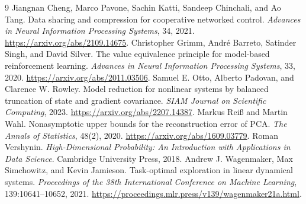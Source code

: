 \documentclass{article}
\begin{document}
\begin{thebibliography}{9}
Jiangnan Cheng, Marco Pavone, Sachin Katti, Sandeep Chinchali, and Ao Tang.
Data sharing and compression for cooperative networked control.
\emph{Advances in Neural Information Processing Systems}, 34, 2021.
\url{https://arxiv.org/abs/2109.14675}.
Christopher Grimm, Andr\'e Barreto, Satinder Singh, and David Silver.
The value equivalence principle for model-based reinforcement learning.
\emph{Advances in Neural Information Processing Systems}, 33, 2020.
\url{https://arxiv.org/abs/2011.03506}.
Samuel E. Otto, Alberto Padovan, and Clarence W. Rowley.
Model reduction for nonlinear systems by balanced truncation of state and gradient covariance.
\emph{SIAM Journal on Scientific Computing}, 2023.
\url{https://arxiv.org/abs/2207.14387}.
Markus Rei\ss{} and Martin Wahl.
Nonasymptotic upper bounds for the reconstruction error of PCA.
\emph{The Annals of Statistics}, 48(2), 2020.
\url{https://arxiv.org/abs/1609.03779}.
Roman Vershynin.
\emph{High-Dimensional Probability: An Introduction with Applications in Data Science}.
Cambridge University Press, 2018.
Andrew J. Wagenmaker, Max Simchowitz, and Kevin Jamieson.
Task-optimal exploration in linear dynamical systems.
\emph{Proceedings of the 38th International Conference on Machine Learning},
139:10641--10652, 2021.
\url{https://proceedings.mlr.press/v139/wagenmaker21a.html}.
\end{thebibliography}


\end{document}
